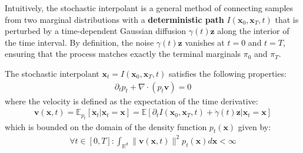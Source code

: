 \documentclass{article}
\begin{document}
Intuitively, the stochastic interpolant is a general method of connecting samples from two marginal distributions with a \textbf{deterministic path} $I(\boldsymbol{x}_0, \boldsymbol{x}_T,t)$ that is perturbed by a time-dependent Gaussian diffusion $\gamma(t)\boldsymbol{z}$ along the interior of the time interval. By definition, the noise $\gamma(t)\boldsymbol{z}$ vanishes at $t=0$ and $t=T$, ensuring that the process matches exactly the terminal marginals $\pi_0$ and $\pi_T$.

\begin{theorem}
    The stochastic interpolant $\boldsymbol{x}_t=I(\boldsymbol{x}_0, \boldsymbol{x}_T,t)$ satisfies the following properties:
    \begin{align}
        \partial_tp_t+\nabla\cdot(p_t\boldsymbol{v})=0\label{eq:si-continuity}
    \end{align}
    where the velocity is defined as the expectation of the time derivative:
    \begin{align}
        \boldsymbol{v}(\boldsymbol{x},t)=\mathbb{E}_{p_t}[\dot{\boldsymbol{x}}_t|\boldsymbol{x}_t=\boldsymbol{x}]=\mathbb{E}[\partial_tI(\boldsymbol{x}_0, \boldsymbol{x}_T,t)+\dot{\gamma}(t)\boldsymbol{z}|\boldsymbol{x}_t=\boldsymbol{x}]
    \end{align}
    which is bounded on the domain of the density function $p_t(\boldsymbol{x})$ given by:
    \begin{align}
        \forall t\in [0,T]:\int_{\mathbb{R}^d}\|\boldsymbol{v}( \boldsymbol{x},t)\|^2p_t(\boldsymbol{x})d\boldsymbol{x}< \infty
    \end{align}
\end{theorem}
\end{document}
